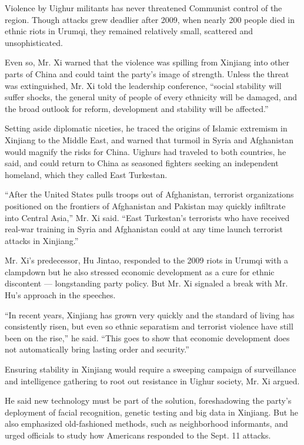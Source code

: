 Violence by Uighur militants has never threatened Communist control of
the region. Though attacks grew deadlier after 2009, when nearly 200
people died in ethnic riots in Urumqi, they remained relatively small,
scattered and unsophisticated.

Even so, Mr. Xi warned that the violence was spilling from Xinjiang into
other parts of China and could taint the party's image of strength.
Unless the threat was extinguished, Mr. Xi told the leadership
conference, ``social stability will suffer shocks, the general unity of
people of every ethnicity will be damaged, and the broad outlook for
reform, development and stability will be affected.''

Setting aside diplomatic niceties, he traced the origins of Islamic
extremism in Xinjiang to the Middle East, and warned that turmoil in
Syria and Afghanistan would magnify the risks for China. Uighurs had
traveled to both countries, he said, and could return to China as
seasoned fighters seeking an independent homeland, which they called
East Turkestan.

``After the United States pulls troops out of Afghanistan, terrorist
organizations positioned on the frontiers of Afghanistan and Pakistan
may quickly infiltrate into Central Asia,'' Mr. Xi said. ``East
Turkestan's terrorists who have received real-war training in Syria and
Afghanistan could at any time launch terrorist attacks in Xinjiang.''

Mr. Xi's predecessor, Hu Jintao, responded to the 2009 riots in Urumqi
with a clampdown but he also stressed economic development as a cure for
ethnic discontent --- longstanding party policy. But Mr. Xi signaled a
break with Mr. Hu's approach in the speeches.

``In recent years, Xinjiang has grown very quickly and the standard of
living has consistently risen, but even so ethnic separatism and
terrorist violence have still been on the rise,'' he said. ``This goes
to show that economic development does not automatically bring lasting
order and security.''

Ensuring stability in Xinjiang would require a sweeping campaign of
surveillance and intelligence gathering to root out resistance in Uighur
society, Mr. Xi argued.

He said new technology must be part of the solution, foreshadowing the
party's deployment of facial recognition, genetic testing and big data
in Xinjiang. But he also emphasized old-fashioned methods, such as
neighborhood informants, and urged officials to study how Americans
responded to the Sept. 11 attacks.


